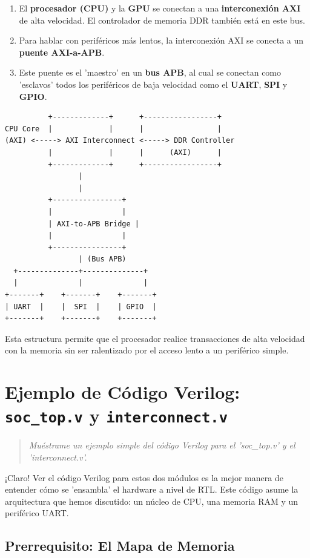 \documentclass[12pt,a4paper]{article}
\newenvironment{pregunta}
  {\begin{leftbar}\begin{quote}\itshape}
  {\end{quote}\end{leftbar}}
\begin{document}
\begin{enumerate}
    \item El \textbf{procesador (CPU)} y la \textbf{GPU} se conectan a una \textbf{interconexión AXI} de alta velocidad. El controlador de memoria DDR también está en este bus.
    \item Para hablar con periféricos más lentos, la interconexión AXI se conecta a un \textbf{puente AXI-a-APB}.
    \item Este puente es el 'maestro' en un \textbf{bus APB}, al cual se conectan como 'esclavos' todos los periféricos de baja velocidad como el \textbf{UART}, \textbf{SPI} y \textbf{GPIO}.
\end{enumerate}

\begin{verbatim}
          +-------------+      +-----------------+
CPU Core  |             |      |                 |
(AXI) <-----> AXI Interconnect <-----> DDR Controller
          |             |      |      (AXI)      |
          +-------------+      +-----------------+
                 |
                 |
          +----------------+
          |                |
          | AXI-to-APB Bridge |
          |                |
          +----------------+
                 | (Bus APB)
  +--------------+--------------+
  |              |              |
+-------+    +-------+    +-------+
| UART  |    |  SPI  |    | GPIO  |
+-------+    +-------+    +-------+
\end{verbatim}

Esta estructura permite que el procesador realice transacciones de alta velocidad con la memoria sin ser ralentizado por el acceso lento a un periférico simple.

\newpage
\section{Ejemplo de Código Verilog: \texttt{soc\_top.v} y \texttt{interconnect.v}}

\begin{pregunta}
Muéstrame un ejemplo simple del código Verilog para el 'soc\_top.v' y el 
'interconnect.v'.
\end{pregunta}

¡Claro! Ver el código Verilog para estos dos módulos es la mejor manera de entender cómo se 'ensambla' el hardware a nivel de RTL. Este código asume la arquitectura que hemos discutido: un núcleo de CPU, una memoria RAM y un periférico UART.

\subsection{Prerrequisito: El Mapa de Memoria}
\end{document}
